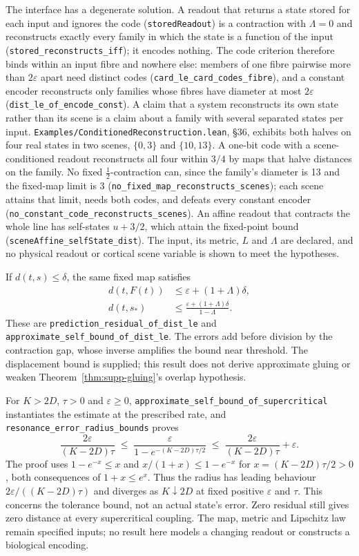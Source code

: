 \documentclass{article}
\begin{document}
The interface has a degenerate solution. A readout that returns a state stored for each input and ignores the code (\texttt{storedReadout}) is a contraction with $\Lambda=0$ and reconstructs exactly every family in which the state is a function of the input (\nolinkurl{stored_reconstructs_iff}); it encodes nothing. The code criterion therefore binds within an input fibre and nowhere else: members of one fibre pairwise more than $2\varepsilon$ apart need distinct codes (\nolinkurl{card_le_card_codes_fibre}), and a constant encoder reconstructs only families whose fibres have diameter at most $2\varepsilon$ (\nolinkurl{dist_le_of_encode_const}). A claim that a system reconstructs its own state rather than its scene is a claim about a family with several separated states per input. \nolinkurl{Examples/ConditionedReconstruction.lean}, \S36, exhibits both halves on four real states in two scenes, $\{0,3\}$ and $\{10,13\}$. A one-bit code with a scene-conditioned readout reconstructs all four within $3/4$ by maps that halve distances on the family. No fixed $\tfrac12$-contraction can, since the family's diameter is 13 and the fixed-map limit is 3 (\nolinkurl{no_fixed_map_reconstructs_scenes}); each scene attains that limit, needs both codes, and defeats every constant encoder (\nolinkurl{no_constant_code_reconstructs_scenes}). An affine readout that contracts the whole line has self-states $u+3/2$, which attain the fixed-point bound (\nolinkurl{sceneAffine_selfState_dist}). The input, its metric, $L$ and $\Lambda$ are declared, and no physical readout or cortical scene variable is shown to meet the hypotheses.

If $d(t,s)\leq\delta$, the same fixed map satisfies
\[
\begin{aligned}
d(t,F(t))&\leq\varepsilon+(1+\Lambda)\delta,\\
d(t,s_*)&\leq\frac{\varepsilon+(1+\Lambda)\delta}{1-\Lambda}.
\end{aligned}
\]
These are \nolinkurl{prediction_residual_of_dist_le}
and \nolinkurl{approximate_self_bound_of_dist_le}.
The errors add before division by the contraction gap, whose inverse amplifies the bound near threshold. The displacement bound is supplied; this result does not derive approximate gluing or weaken Theorem~\ref{thm:supp-gluing}'s overlap hypothesis.

For $K>2D$, $\tau>0$ and $\varepsilon\geq0$,
\nolinkurl{approximate_self_bound_of_supercritical}
instantiates the estimate at the prescribed rate, and
\nolinkurl{resonance_error_radius_bounds} proves
\[
\frac{2\varepsilon}{(K-2D)\tau}
\;\leq\;\frac{\varepsilon}{1-e^{-(K-2D)\tau/2}}
\;\leq\;\frac{2\varepsilon}{(K-2D)\tau}+\varepsilon.
\]
The proof uses $1-e^{-x}\leq x$ and $x/(1+x)\leq1-e^{-x}$ for $x=(K-2D)\tau/2>0$, both consequences of $1+x\leq e^x$. Thus the radius has leading behaviour $2\varepsilon/((K-2D)\tau)$ and diverges as $K\downarrow2D$ at fixed positive $\varepsilon$ and $\tau$. This concerns the tolerance bound, not an actual state's error. Zero residual still gives zero distance at every supercritical coupling. The map, metric and Lipschitz law remain specified inputs; no result here models a changing readout or constructs a biological encoding.
\end{document}
